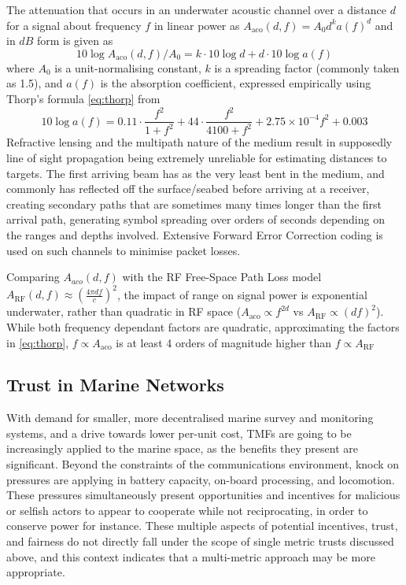 \documentclass[conference]{IEEEtran}
\begin{document}
The attenuation that occurs in an underwater acoustic channel over a distance $d$ for a signal about frequency $f$ in linear power as $A_{\text{aco}}(d,f) = A_0d^ka(f)^d$ and in $dB$ form is given as 
%
\begin{equation}
  \label{eq:acoattenuationdb}
  10 \log A_{\text{aco}}(d,f)/A_0 = k \cdot 10 \log d + d \cdot 10 \log a(f)
\end{equation}
%
where $A_0$ is a unit-normalising constant, $k$ is a spreading factor (commonly taken as 1.5), and $a(f)$ is the absorption coefficient, expressed empirically using Thorp's formula \eqref{eq:thorp} from \cite{Stojanovic2007}
%
\begin{equation}
  \label{eq:thorp}
  10 \log a(f) = 0.11 \cdot \frac{f^2}{1+f^2} + 44\cdot\frac{f^2}{4100+f^2}+ 2.75\times10^{-4} f^2 + 0.003
\end{equation}
%
Refractive lensing and the multipath nature of the medium result in supposedly line of sight propagation being extremely unreliable for estimating distances to targets.
The first arriving beam has as the very least bent in the medium, and commonly has reflected off the surface/seabed before arriving at a receiver, creating secondary paths that are sometimes many times longer than the first arrival path, generating symbol spreading over orders of seconds depending on the ranges and depths involved.
Extensive Forward Error Correction coding is used on such channels to minimise packet losses.

Comparing $A_{aco}(d,f)$ with the RF Free-Space Path Loss model $A_{\text{RF}}(d,f) \approx \left( \frac{4\pi d f}{c} \right)^2$, the impact of range on signal power is exponential underwater, rather than quadratic in RF space ($A_{\text{aco}} \propto f^{2d}$ vs $A_{\text{RF}} \propto (df)^2$). 
While both frequency dependant factors are quadratic, approximating the factors in \eqref{eq:thorp}, $f\propto A_{\text{aco}}$ is at least 4 orders of magnitude higher than $f\propto A_{\text{RF}}$


\subsection{Trust in Marine Networks}\label{sec:trust_in_marine}

With demand for smaller, more decentralised marine survey and monitoring systems, and a drive towards lower per-unit cost, TMFs are going to be increasingly applied to the marine space, as the benefits they present are significant.
Beyond the constraints of the communications environment, knock on pressures are applying in battery capacity, on-board processing, and locomotion.
These pressures simultaneously present opportunities and incentives for malicious or selfish actors to appear to cooperate while not reciprocating, in order to conserve power for instance.
These multiple aspects of potential incentives, trust, and fairness do not directly fall under the scope of single metric trusts discussed above, and this context indicates that a multi-metric approach may be more appropriate.
\end{document}
